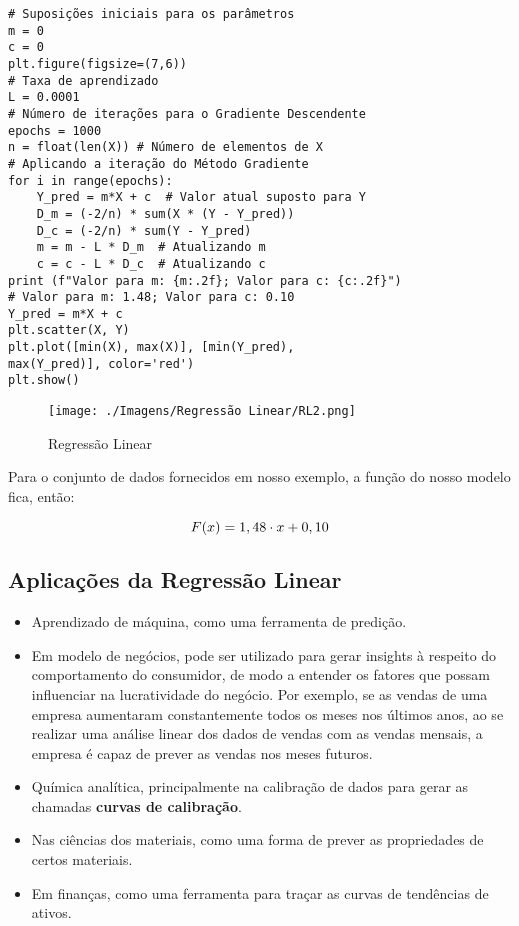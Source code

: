 \begin{verbatim}
# Suposições iniciais para os parâmetros
m = 0
c = 0
plt.figure(figsize=(7,6))
# Taxa de aprendizado
L = 0.0001  
# Número de iterações para o Gradiente Descendente
epochs = 1000  
n = float(len(X)) # Número de elementos de X
# Aplicando a iteração do Método Gradiente 
for i in range(epochs): 
	Y_pred = m*X + c  # Valor atual suposto para Y
	D_m = (-2/n) * sum(X * (Y - Y_pred)) 
	D_c = (-2/n) * sum(Y - Y_pred) 
	m = m - L * D_m  # Atualizando m
	c = c - L * D_c  # Atualizando c
print (f"Valor para m: {m:.2f}; Valor para c: {c:.2f}")
# Valor para m: 1.48; Valor para c: 0.10
Y_pred = m*X + c
plt.scatter(X, Y) 
plt.plot([min(X), max(X)], [min(Y_pred), 
max(Y_pred)], color='red')
plt.show()
\end{verbatim}

\begin{figure}[H]
	\centering
	\texttt{[image: ./Imagens/Regressão Linear/RL2.png]} 
	\caption{Regressão Linear}
	\label{fig:RL2}
\end{figure}

Para o conjunto de dados fornecidos em nosso exemplo, a função do nosso modelo fica, então:

\[ \large F(x) = 1,48 \cdot x + 0,10 \]

\subsection{Aplicações da Regressão Linear}

\begin{itemize}
\item Aprendizado de máquina, como uma ferramenta de predição.
\item Em modelo de negócios, pode ser utilizado para gerar insights à respeito do comportamento do consumidor, de modo a entender os fatores que possam influenciar na lucratividade do negócio. Por exemplo, se as vendas de uma empresa aumentaram constantemente todos os meses nos últimos anos, ao se realizar uma análise linear dos dados de vendas com as vendas mensais, a empresa é capaz de prever as vendas nos meses futuros. 
\item Química analítica, principalmente na calibração de dados para gerar as chamadas \textbf{curvas de calibração}.
\item Nas ciências dos materiais, como uma forma de prever as propriedades de certos materiais.
\item Em finanças, como uma ferramenta para traçar as curvas de tendências de ativos.

\end{itemize} 



